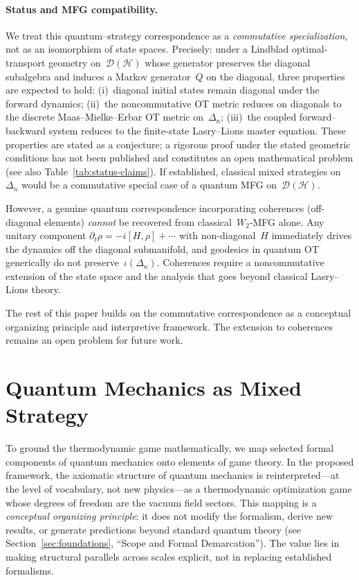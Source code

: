 \documentclass[12pt,a4paper]{article}
\theoremstyle{remark}
\begin{document}
\paragraph{Status and MFG compatibility.}
We treat this quantum--strategy correspondence as a \emph{commutative specialization}, not as an isomorphism of state spaces. Precisely: under a Lindblad optimal-transport geometry on~$\mathcal{D}(\mathcal{H})$ whose generator preserves the diagonal subalgebra and induces a Markov generator~$Q$ on the diagonal, three properties are expected to hold: (i)~diagonal initial states remain diagonal under the forward dynamics; (ii)~the noncommutative OT metric reduces on diagonals to the discrete Maas--Mielke--Erbar OT metric on~$\Delta_n$; (iii)~the coupled forward--backward system reduces to the finite-state Lasry--Lions master equation. These properties are stated as a conjecture; a rigorous proof under the stated geometric conditions has not been published and constitutes an open mathematical problem (see also Table~\ref{tab:status-claims}). If established, classical mixed strategies on~$\Delta_n$ would be a commutative special case of a quantum MFG on~$\mathcal{D}(\mathcal{H})$.

However, a genuine quantum correspondence incorporating coherences (off-diagonal elements) \emph{cannot} be recovered from classical~$W_2$-MFG alone. Any unitary component $\partial_t \rho = -i[H, \rho] + \cdots$ with non-diagonal~$H$ immediately drives the dynamics off the diagonal submanifold, and geodesics in quantum OT generically do not preserve~$\iota(\Delta_n)$. Coherences require a noncommutative extension of the state space and the analysis that goes beyond classical Lasry--Lions theory.

The rest of this paper builds on the commutative correspondence as a conceptual organizing principle and interpretive framework. The extension to coherences remains an open problem for future work.

\section{Quantum Mechanics as Mixed Strategy}
\label{sec:quantum}

To ground the thermodynamic game mathematically, we map selected formal components of quantum mechanics onto elements of game theory. In the proposed framework, the axiomatic structure of quantum mechanics is reinterpreted---at the level of vocabulary, not new physics---as a thermodynamic optimization game whose degrees of freedom are the vacuum field sectors. This mapping is a \emph{conceptual organizing principle}: it does not modify the formalism, derive new results, or generate predictions beyond standard quantum theory (see Section~\ref{sec:foundations}, ``Scope and Formal Demarcation''). The value lies in making structural parallels across scales explicit, not in replacing established formalisms.
\end{document}
